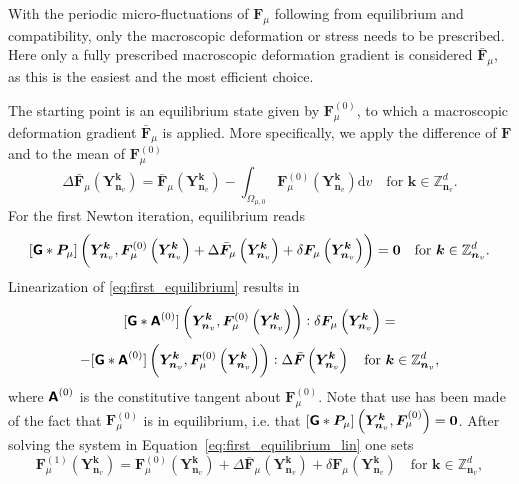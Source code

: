 With the periodic micro-fluctuations of \(\bm{F}_\mu\) following from equilibrium and compatibility, only the macroscopic deformation or stress needs to be prescribed.
Here only a fully prescribed macroscopic deformation gradient is considered \(\bar{\bm{F}}_\mu\), as this is the easiest and the most efficient choice.

The starting point is an equilibrium state given by \({\bm{F}}_\mu^{(0)}\), to which  a macroscopic deformation gradient \(\bar{\bm{F}}_\mu\) is applied.
More specifically, we apply the difference of \(\bm{\bm{F}}\) and to the mean of \({\bm{F}}_\mu^{(0)}\)
\begin{equation}
\Delta \bar{\bm{F}}_\mu\left(\bm Y_{\bm n_v}^{\bm  k}\right)=\bar{\boldsymbol{F}}_\mu\left(\bm Y_{\bm n_v}^{\bm  k}\right)-\int_{\Omega_{\mu,0}} {\bm{F}}_\mu^{(0)}\left(\bm Y_{\bm n_v}^{\bm  k}\right) \mathrm{d} v\quad \text{for \(\bm k \in \mathbb Z^d_{\bm n_v}\)}.
\end{equation}
For the first Newton iteration, equilibrium reads
\begin{equation} \label{eq:first_equilibrium}
[\boldsymbol{\mathsf{G}}* \bm {P}_\mu]\left(\bm Y_{\bm n_v}^{\bm  k},\bm{F}_\mu^{(0)}\left(\bm Y_{\bm n_v}^{\bm  k}\right)+\Delta \bar{\boldsymbol{F}}_\mu\left(\bm Y_{\bm n_v}^{\bm  k}\right)+\delta {\boldsymbol{F}}_\mu\left(\bm Y_{\bm n_v}^{\bm  k}\right)\right)=\bm{0}\quad \text{for \(\bm k \in \mathbb Z^d_{\bm n_v}\)}.
\end{equation}
Linearization of \eqref{eq:first_equilibrium} results in
\begin{multline}\label{eq:first_equilibrium_lin}
[\boldsymbol{\mathsf{G}}* \boldsymbol{\mathsf{A}}^{(0)}]\left(\bm Y_{\bm n_v}^{\bm  k}, \bm F_\mu^{(0)}\left(\bm Y_{\bm n_v}^{\bm  k}\right)\right): \delta \bm{F}_\mu\left(\bm Y_{\bm n_v}^{\bm  k}\right)=\\-[\boldsymbol{\mathsf{G}}* \boldsymbol{\mathsf{A}}^{(0)}]\left(\bm Y_{\bm n_v}^{\bm  k}, \bm F_\mu^{(0)}\left(\bm Y_{\bm n_v}^{\bm  k}\right)\right): \Delta \bar{\bm{F}}\left(\bm Y_{\bm n_v}^{\bm  k}\right)\quad \text{for \(\bm k \in \mathbb Z^d_{\bm n_v}\)},
\end{multline}
where \(\boldsymbol{\mathsf{A}}^{(0)}\) is the constitutive tangent about \({\bm{F}}_\mu^{(0)}\).
Note that use has been made of the fact that \({\bm{F}}_\mu^{(0)}\) is in equilibrium, i.e. that \([\boldsymbol{\mathsf{G}} * \bm P_\mu]\left(\bm Y_{\bm n_v}^{\bm  k}, {\bm{F}}_\mu^{(0)}\right)={\bm{0}}\).
After solving the system in Equation~\eqref{eq:first_equilibrium_lin} one sets
\begin{equation}
{\bm{F}}_\mu^{(1)}\left(\bm Y_{\bm n_v}^{\bm  k}\right)={\bm{F}}_\mu^{(0)}\left(\bm Y_{\bm n_v}^{\bm  k}\right)+\Delta \bar{\bm{F}}_\mu\left(\bm Y_{\bm n_v}^{\bm  k}\right)+\delta {\bm{F}}_\mu\left(\bm Y_{\bm n_v}^{\bm  k}\right)\quad \text{for \(\bm k \in \mathbb Z^d_{\bm n_v}\)},
\end{equation}
